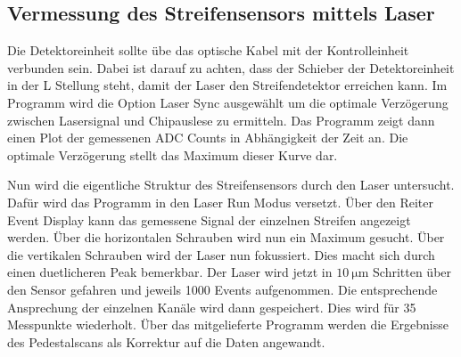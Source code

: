 \subsection{Vermessung des Streifensensors mittels Laser}

Die Detektoreinheit sollte übe das optische Kabel mit der Kontrolleinheit verbunden sein.
Dabei ist darauf zu achten, dass der Schieber der Detektoreinheit in der L Stellung steht, damit der Laser den Streifendetektor erreichen kann.
Im Programm wird die Option Laser Sync ausgewählt um die optimale Verzögerung zwischen Lasersignal und Chipauslese zu ermitteln.
Das Programm zeigt dann einen Plot der gemessenen ADC Counts in Abhängigkeit der Zeit an.
Die optimale Verzögerung stellt das Maximum dieser Kurve dar.

Nun wird die eigentliche Struktur des Streifensensors durch den Laser untersucht.
Dafür wird das Programm in den Laser Run Modus versetzt.
Über den Reiter Event Display kann das gemessene Signal der einzelnen Streifen angezeigt werden.
Über die horizontalen Schrauben wird nun ein Maximum gesucht.
Über die vertikalen Schrauben wird der Laser nun fokussiert.
Dies macht sich durch einen duetlicheren Peak bemerkbar.
Der Laser wird jetzt in $\SI{10}{\micro\metre}$ Schritten über den Sensor gefahren und jeweils 1000 Events aufgenommen.
Die entsprechende Ansprechung der einzelnen Kanäle wird dann gespeichert.
Dies wird für 35 Messpunkte wiederholt.
Über das mitgelieferte Programm werden die Ergebnisse des Pedestalscans als Korrektur auf die Daten angewandt.
